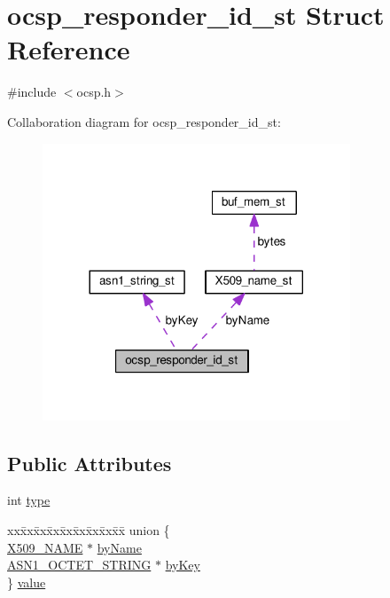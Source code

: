 \hypertarget{structocsp__responder__id__st}{}\section{ocsp\+\_\+responder\+\_\+id\+\_\+st Struct Reference}
\label{structocsp__responder__id__st}


{\ttfamily \#include $<$ocsp.\+h$>$}



Collaboration diagram for ocsp\+\_\+responder\+\_\+id\+\_\+st\+:
\nopagebreak
\begin{figure}[H]
\begin{center}
\leavevmode
\includegraphics[width=260pt]{structocsp__responder__id__st__coll__graph}
\end{center}
\end{figure}
\subsection*{Public Attributes}
\begin{DoxyCompactItemize}
\item 
int \hyperlink{structocsp__responder__id__st_a77bb04f705903d3d2e8c3b5671d6adc6}{type}
\item 
\begin{tabbing}
xx\=xx\=xx\=xx\=xx\=xx\=xx\=xx\=xx\=\kill
union \{\\
\>\hyperlink{ossl__typ_8h_a5c5fc036757e87b9bd163d0221696533}{X509\_NAME} $\ast$ \hyperlink{structocsp__responder__id__st_ae32efd81ddf7eb1dc1f88e1c5f30de60}{byName}\\
\>\hyperlink{ossl__typ_8h_afbd05e94e0f0430a2b729473efec88c1}{ASN1\_OCTET\_STRING} $\ast$ \hyperlink{structocsp__responder__id__st_adcb31c53f92204c113dadabeec60c6ad}{byKey}\\
\} \hyperlink{structocsp__responder__id__st_ab32d02c2b49fd8deafd2be676194b6c8}{value}\\

\end{tabbing}\end{DoxyCompactItemize}


